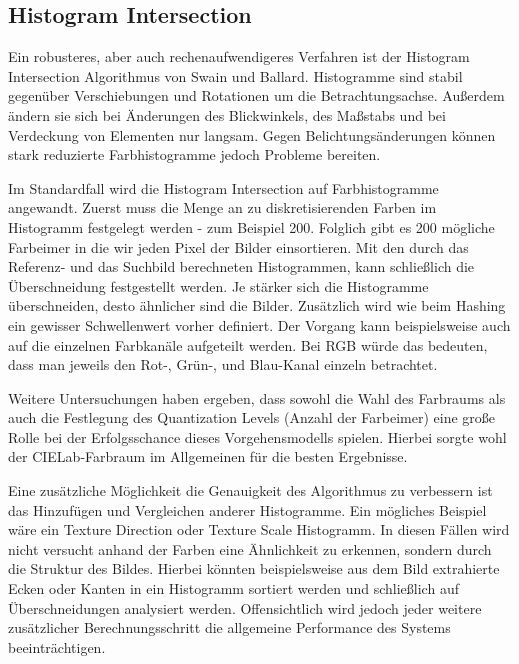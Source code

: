 \subsection{Histogram Intersection}
Ein robusteres, aber auch rechenaufwendigeres Verfahren ist der Histogram
Intersection Algorithmus von Swain und Ballard. Histogramme sind stabil
gegenüber Verschiebungen und Rotationen um die Betrachtungsachse. Außerdem
ändern sie sich bei Änderungen des Blickwinkels, des Maßstabs und bei Verdeckung
von Elementen nur langsam. Gegen Belichtungsänderungen können stark reduzierte
Farbhistogramme jedoch Probleme bereiten. \parencite{histogram-swain-ballard}

Im Standardfall wird die Histogram Intersection auf Farbhistogramme angewandt. 
Zuerst muss die Menge an zu diskretisierenden Farben im Histogramm festgelegt
werden - zum Beispiel 200. Folglich gibt es 200 mögliche \glqq{}Farbeimer\grqq{}
in die wir jeden Pixel der Bilder einsortieren. Mit den durch das Referenz- und
das Suchbild berechneten Histogrammen, kann schließlich die Überschneidung
festgestellt werden. Je stärker sich die Histogramme überschneiden, desto
ähnlicher sind die Bilder. \parencite{histogram-image-similarity} Zusätzlich
wird wie beim Hashing ein gewisser Schwellenwert vorher definiert. Der Vorgang
kann beispielsweise auch auf die einzelnen Farbkanäle aufgeteilt werden. Bei RGB
würde das bedeuten, dass man jeweils den Rot-, Grün-, und Blau-Kanal einzeln
betrachtet. \parencite{histogram-swain-ballard}

Weitere Untersuchungen haben ergeben, dass sowohl die Wahl des Farbraums als
auch die Festlegung des Quantization Levels (Anzahl der Farbeimer) eine große
Rolle bei der Erfolgsschance dieses Vorgehensmodells spielen. Hierbei sorgte
wohl der CIELab-Farbraum im Allgemeinen für die besten Ergebnisse.
\parencite{histogram-image-similarity}

Eine zusätzliche Möglichkeit die Genauigkeit des Algorithmus zu verbessern ist
das Hinzufügen und Vergleichen anderer Histogramme. Ein mögliches Beispiel wäre
ein \glqq{}Texture Direction\grqq{} oder \glqq{}Texture Scale\grqq{} Histogramm.
In diesen Fällen wird nicht versucht anhand der Farben eine Ähnlichkeit zu
erkennen, sondern durch die Struktur des Bildes. Hierbei könnten beispielsweise
aus dem Bild extrahierte Ecken oder Kanten in ein Histogramm sortiert werden und
schließlich auf Überschneidungen analysiert werden.
\parencite{histogram-stackoverflow} Offensichtlich wird jedoch jeder weitere
zusätzlicher Berechnungsschritt die allgemeine Performance des Systems
beeinträchtigen.